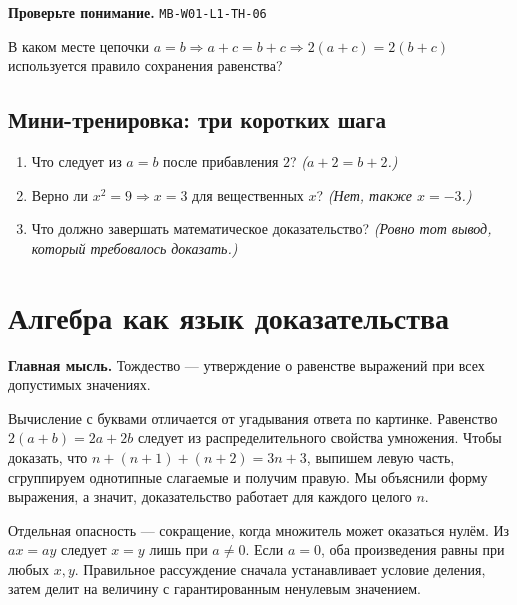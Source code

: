 \documentclass[11pt,a4paper,openany]{book}
\newcommand{\muid}[1]{\texttt{\footnotesize #1}}
\begin{document}
\begin{learnbox}\textbf{Проверьте понимание.} \muid{MB-W01-L1-TH-06}\par В каком месте цепочки $a=b\Rightarrow a+c=b+c\Rightarrow 2(a+c)=2(b+c)$ используется правило сохранения равенства?\end{learnbox}

\subsection*{Мини-тренировка: три коротких шага}
\begin{enumerate}[label=\arabic*),leftmargin=*,itemsep=3pt]

\item Что следует из $a=b$ после прибавления $2$? \textit{($a+2=b+2$.)}

\item Верно ли $x^2=9\Rightarrow x=3$ для вещественных $x$? \textit{(Нет, также $x=-3$.)}

\item Что должно завершать математическое доказательство? \textit{(Ровно тот вывод, который требовалось доказать.)}

\end{enumerate}

\medskip

\section{Алгебра как язык доказательства}\label{theory:7}

\begin{keybox}\textbf{Главная мысль.} Тождество — утверждение о равенстве выражений при всех допустимых значениях.\end{keybox}

Вычисление с буквами отличается от угадывания ответа по картинке. Равенство $2(a+b)=2a+2b$ следует из распределительного свойства умножения. Чтобы доказать, что $n+(n+1)+(n+2)=3n+3$, выпишем левую часть, сгруппируем однотипные слагаемые и получим правую. Мы объяснили форму выражения, а значит, доказательство работает для каждого целого $n$.


Отдельная опасность — сокращение, когда множитель может оказаться нулём. Из $ax=ay$ следует $x=y$ лишь при $a\ne0$. Если $a=0$, оба произведения равны при любых $x,y$. Правильное рассуждение сначала устанавливает условие деления, затем делит на величину с гарантированным ненулевым значением.
\end{document}
